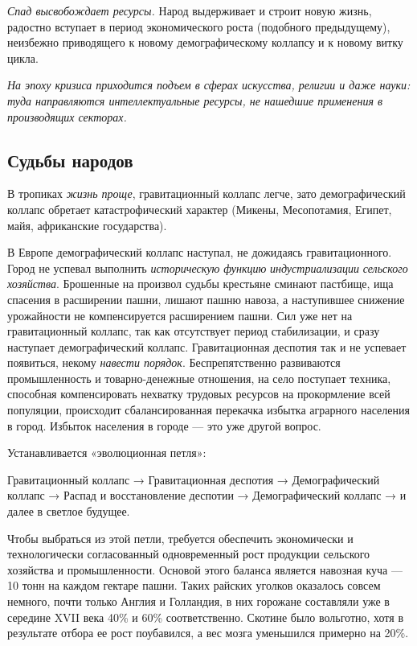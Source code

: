 \documentclass[twoside,a4paper]{article}
\begin{document}
{
\textit{Спад высвобождает ресурсы.}\textbf{ }Народ выдерживает и строит новую жизнь, радостно вступает в период
экономического роста (подобного предыдущему), неизбежно приводящего к новому демографическому коллапсу и к новому витку
цикла. }

{\itshape
На эпоху кризиса приходится подъем в сферах искусства, религии и даже науки: туда направляются интеллектуальные ресурсы,
не нашедшие применения в производящих секторах. }

\subsection[Судьбы народов]{\rmfamily Судьбы народов}
{
В тропиках \textit{жизнь проще}, гравитационный коллапс легче, зато демографический коллапс обретает катастрофический
характер (Микены, Месопотамия, Египет, майя, африканские государства).}

{
В Европе демографический коллапс наступал, не дожидаясь гравитационного. Город не успевал выполнить \textit{историческую
функцию} \textit{индустриализации} \textit{сельского хозяйства}. Брошенные на произвол судьбы крестьяне сминают
пастбище, ища спасения в расширении пашни, лишают пашню навоза, а наступившее снижение урожайности не компенсируется
расширением пашни. Сил уже нет на гравитационный коллапс, так как отсутствует период стабилизации, и сразу наступает
демографический коллапс. Гравитационная деспотия так и не успевает появиться, некому \textit{навести порядок}.
Беспрепятственно развиваются промышленность и товарно-денежные отношения, на село поступает техника, способная
компенсировать нехватку трудовых ресурсов на прокормление всей популяции, происходит сбалансированная перекачка избытка
аграрного населения в город. Избыток населения в городе — это уже другой вопрос.}

{
Устанавливается «эволюционная петля»:}

{
Гравитационный коллапс → Гравитационная деспотия → Демографический коллапс → Распад и восстановление деспотии →
Демографический коллапс → и далее в светлое будущее.}

{
Чтобы выбраться из этой петли, требуется обеспечить экономически и технологически согласованный одновременный рост
продукции сельского хозяйства и промышленности. Основой этого баланса является навозная куча — 10 тонн на каждом
гектаре пашни. Таких райских уголков оказалось совсем немного, почти только Англия и Голландия, в них горожане
составляли уже в середине \foreignlanguage{english}{XVII} века 40\% и 60\% соответственно. Скотине было вольготно, хотя
в результате отбора ее рост поубавился, а вес мозга уменьшился примерно на 20\%. }
\end{document}
